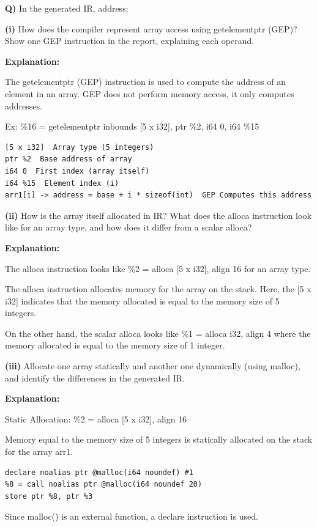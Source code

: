 \textbf{Q)} In the generated IR, address:


\textbf{(i)} How does the compiler represent array access using getelementptr (GEP)? Show one GEP instruction in the report, explaining each operand.


\textbf{Explanation:} 


The getelementptr (GEP) instruction is used to compute the address of an element in an array. GEP does not perform memory access, it only computes addresses. 


Ex: \%16 = getelementptr inbounds [5 x i32], ptr \%2, i64 0, i64 \%15


\begin{lstlisting}
[5 x i32]  Array type (5 integers)
ptr %2  Base address of array
i64 0  First index (array itself)
i64 %15  Element index (i)
arr1[i] -> address = base + i * sizeof(int)  GEP Computes this address
\end{lstlisting}

\textbf{(ii)} How is the array itself allocated in IR? What does the alloca instruction look like for an array type, and how does it differ from a scalar alloca?


\textbf{Explanation:}


The alloca instruction looks like \%2 = alloca [5 x i32], align 16 for an array type.


The alloca instruction allocates memory for the array on the stack. Here, the [5 x i32] indicates that the memory allocated is equal to the memory size of 5 integers.


On the other hand, the scalar alloca looks like \%1 = alloca i32, align 4 where the memory allocated is equal to the memory size of 1 integer.


\textbf{(iii)} Allocate one array statically and another one dynamically (using malloc), and identify the differences in the generated IR. 


\textbf{Explanation:} 


Static Allocation: \%2 = alloca [5 x i32], align 16


Memory equal to the memory size of 5 integers is statically allocated on the stack for the array arr1.


\begin{lstlisting}
declare noalias ptr @malloc(i64 noundef) #1
%8 = call noalias ptr @malloc(i64 noundef 20)
store ptr %8, ptr %3
\end{lstlisting}

Since malloc() is an external function, a declare instruction is used.


